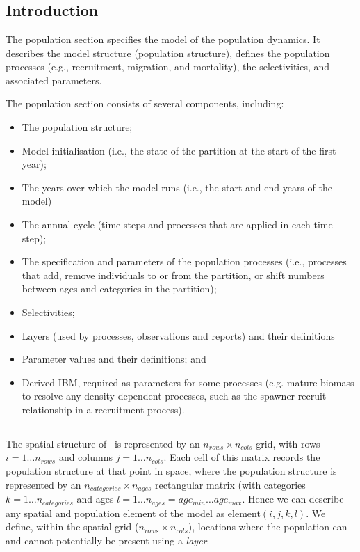 \section{\label{sec:population-section}}

\subsection{Introduction}
The population section specifies the model of the population dynamics. It describes the model structure (population structure), defines the population processes (e.g., recruitment, migration, and mortality), the selectivities, and associated parameters.

The population section consists of several components, including:
\begin{itemize}
  \item The population structure;
  \item Model initialisation (i.e., the state of the partition at the start of the first year);
  \item The years over which the model runs (i.e., the start and end years of the model)
  \item The annual cycle (time-steps and processes that are applied in each time-step);
  \item The specification and parameters of the population processes (i.e., processes that add, remove individuals to or from the partition, or shift numbers between ages and categories in the partition);
  \item Selectivities;
  \item Layers (used by processes, observations and reports) and their definitions
  \item Parameter values and their definitions; and
  \item Derived IBM, required as parameters for some processes (e.g. mature biomass to resolve any density dependent processes, such as the spawner-recruit relationship in a recruitment process).
\end{itemize}

\subsection{\label{sec:spatial-structure}}

The spatial structure of \IBM\ is represented by an $n_{rows} \times n_{cols}$ grid, with rows $i=1 \dots n_{rows}$ and columns $j=1 \ldots n_{cols}$. Each cell of this matrix records the population structure at that point in space, where the population structure is represented by an $n_{categories} \times n_{ages}$ rectangular matrix (with categories $k=1 \ldots n_{categories}$ and ages $l=1 \ldots n_{ages} = age_{min} \ldots age_{max}$. Hence we can describe any spatial and population element of the model as element$(i,j,k,l)$. We define, within the spatial grid ($n_{rows} \times n_{cols}$), locations where the population can and cannot potentially be present using a \emph{layer}. 

